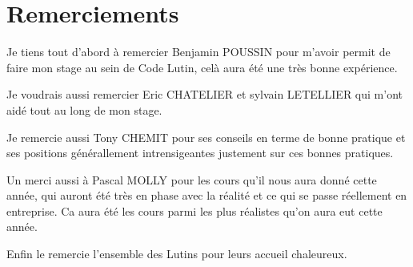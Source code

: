 \section*{Remerciements}


Je tiens tout d'abord à remercier Benjamin POUSSIN pour m'avoir permit de faire 
mon stage au sein de Code Lutin, celà aura été une très bonne expérience.

Je voudrais aussi remercier Eric CHATELIER et sylvain LETELLIER qui m'ont 
aidé tout au long de mon stage.

Je remercie aussi Tony CHEMIT pour ses conseils en terme de bonne pratique et ses
positions générallement intrensigeantes justement sur ces bonnes pratiques.

Un merci aussi à Pascal MOLLY pour les cours qu'il nous aura donné cette année,
qui auront été très en phase avec la réalité et ce qui se passe réellement en 
entreprise. Ca aura été les cours parmi les plus réalistes qu'on aura eut
cette année. 

Enfin le remercie l'ensemble des Lutins pour leurs accueil chaleureux.
